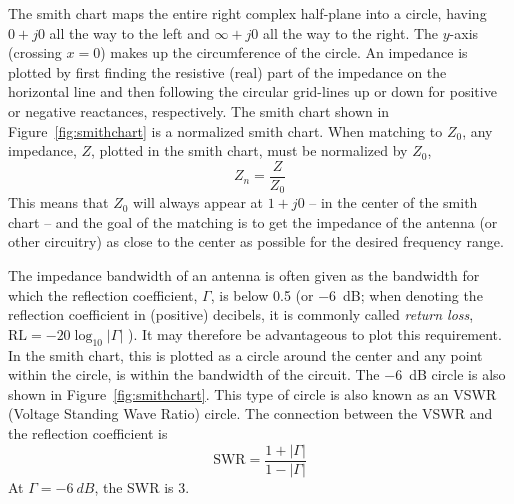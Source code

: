 The smith chart maps the entire right complex half-plane into a circle, having $0+j0$ all the way to the left and $\infty+j0$ all the way to the right. The $y$-axis (crossing $x=0$) makes up the circumference of the circle. An impedance is plotted by first finding the resistive (real) part of the impedance on the horizontal line and then following the circular grid-lines up or down for positive or negative reactances, respectively. 
The smith chart shown in Figure~\ref{fig:smithchart} is a normalized smith chart. When matching to $Z_0$, any impedance, $Z$, plotted in the smith chart, must be normalized by $Z_0$,
\begin{equation}
    Z_n = \frac{Z}{Z_0}
\end{equation}
This means that $Z_0$ will always appear at $1+j0$ -- in the center of the smith chart -- and the goal of the matching is to get the impedance of the antenna (or other circuitry) as close to the center as possible for the desired frequency range.

The impedance bandwidth of an antenna is often given as the bandwidth for which the reflection coefficient, $\Gamma$, is below 0.5 (or \SI{-6}{dB}; when denoting the reflection coefficient in (positive) decibels, it is commonly called \emph{return loss}, $\text{RL} = -20\log_{10}|\Gamma|$ \cite{pozar2011microwave}). It may therefore be advantageous to plot this requirement. In the smith chart, this is plotted as a circle around the center and any point within the circle, is within the bandwidth of the circuit. The \SI{-6}{dB} circle is also shown in Figure~\ref{fig:smithchart}. This type of circle is also known as an VSWR (Voltage Standing Wave Ratio) circle. The connection between the VSWR and the reflection coefficient is \cite{pozar2011microwave}
\begin{equation}
    \text{SWR} = \frac{1 + |\Gamma|}{1 - |\Gamma|}
\end{equation}
At $\Gamma = \SI{-6}{dB}$, the SWR is 3.

